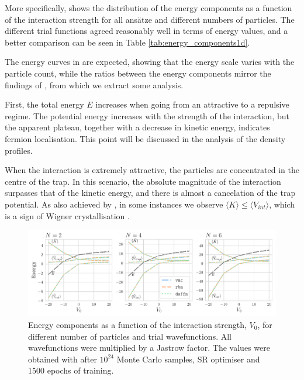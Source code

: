 More specifically,  shows the distribution of the energy components as a function of the interaction strength for all ansätze and different numbers of particles. The different trial functions agreed reasonably well in terms of energy values, and a better comparison can be seen in Table \ref{tab:energy_components1d}.

The energy curves in  are expected, showing that the energy scale varies with the particle count, while the ratios between the energy components mirror the findings of \cite{drissifermion}, from which we extract some analysis.

First, the total energy $E$ increases when going from an attractive to a repulsive regime. The potential energy increases with the strength of the interaction, but the apparent plateau, together with a decrease in kinetic energy, indicates fermion localisation. This point will be discussed in the analysis of the density profiles. 

When the interaction is extremely attractive, the particles are concentrated in the centre of the trap. In this scenario, the absolute magnitude of the interaction surpasses that of the kinetic energy, and there is almost a cancelation of the trap potential. As also achieved by \cite{drissifermion}, in some instances we observe $\langle K \rangle \leq \langle V_{int} \rangle$, which is a sign of Wigner crystallisation \cite{Vu_2020}.

\begin{figure}[H]
    \centering
        \includegraphics[width=1\linewidth]{Chapters/Results/N2/energy_components_vs_v0.pdf}
    \caption{Energy components as a function of the interaction strength, $V_0$, for different number of particles and trial wavefunctions. All wavefunctions were multiplied by a Jastrow factor. The values were obtained with after $10^{24}$ Monte Carlo samples, SR optimiser and 1500 epochs of training.}
    \label{fig:energy_components1d}
\end{figure}

